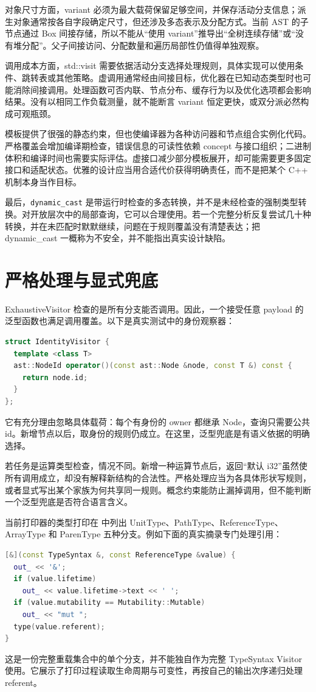 对象尺寸方面，variant 必须为最大载荷保留足够空间，并保存活动分支信息；派生对象通常按各自字段确定尺寸，但还涉及多态表示及分配方式。当前 AST 的子节点通过 Box 间接存储，所以不能从“使用 variant”推导出“全树连续存储”或“没有堆分配”。父子间接访问、分配数量和遍历局部性仍值得单独观察。

调用成本方面，std::visit 需要依据活动分支选择处理规则，具体实现可以使用条件、跳转表或其他策略。虚调用通常经由间接目标，优化器在已知动态类型时也可能消除间接调用。处理函数可否内联、节点分布、缓存行为以及优化选项都会影响结果。没有以相同工作负载测量，就不能断言 variant 恒定更快，或双分派必然构成可观瓶颈。

模板提供了很强的静态约束，但也使编译器为各种访问器和节点组合实例化代码。严格覆盖会增加编译期检查，错误信息的可读性依赖 concept 与接口组织；二进制体积和编译时间也需要实际评估。虚接口减少部分模板展开，却可能需要更多固定接口和适配状态。优雅的设计应当用合适代价获得明确责任，而不是把某个 C++ 机制本身当作目标。

最后，\texttt{dynamic\_cast} 是带运行时检查的多态转换，并不是未经检查的强制类型转换。对开放层次中的局部查询，它可以合理使用。若一个完整分析反复尝试几十种转换，并在未匹配时默默继续，问题在于规则覆盖没有清楚表达；把 dynamic\_cast 一概称为不安全，并不能指出真实设计缺陷。

\section{严格处理与显式兜底}
ExhaustiveVisitor 检查的是所有分支能否调用。因此，一个接受任意 payload 的泛型函数也满足调用覆盖。以下是真实测试中的身份观察器：
\begin{lstlisting}[language=C++]
struct IdentityVisitor {
  template <class T>
  ast::NodeId operator()(const ast::Node &node, const T &) const {
    return node.id;
  }
};
\end{lstlisting}
它有充分理由忽略具体载荷：每个有身份的 owner 都继承 Node，查询只需要公共 id。新增节点以后，取身份的规则仍成立。在这里，泛型兜底是有语义依据的明确选择。

若任务是运算类型检查，情况不同。新增一种运算节点后，返回“默认 i32”虽然使所有调用成立，却没有解释新结构的合法性。严格处理应当为各具体形状写规则，或者显式写出某个家族为何共享同一规则。概念约束能防止漏掉调用，但不能判断一个泛型兜底是否符合语言含义。

当前打印器的类型打印在  中列出 UnitType、PathType、ReferenceType、ArrayType 和 ParenType 五种分支。例如下面的真实摘录专门处理引用：
\begin{lstlisting}[language=C++]
[&](const TypeSyntax &, const ReferenceType &value) {
  out_ << '&';
  if (value.lifetime)
    out_ << value.lifetime->text << ' ';
  if (value.mutability == Mutability::Mutable)
    out_ << "mut ";
  type(value.referent);
}
\end{lstlisting}
这是一份完整重载集合中的单个分支，并不能独自作为完整 TypeSyntax Visitor 使用。它展示了打印过程读取生命周期与可变性，再按自己的输出次序递归处理 referent。

